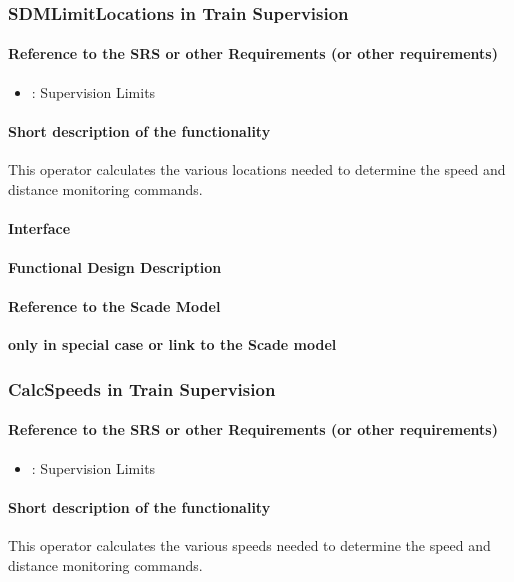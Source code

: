 \subsubsection{SDMLimitLocations in Train Supervision} 
\paragraph{Reference to the SRS or other Requirements (or other requirements)}
\begin{itemize}
	\item \cite[Chapt.~3.13.9]{subset-026}: Supervision Limits 
\end{itemize}

\paragraph{Short description of the functionality}
This operator calculates the various locations needed to determine the speed and distance monitoring commands.

\paragraph{Interface}
\paragraph{Functional Design Description}
\paragraph{Reference to the Scade Model}
\textbf{only in special case or link to the Scade model}

\subsubsection{CalcSpeeds in Train Supervision}
\paragraph{Reference to the SRS or other Requirements (or other requirements)}
\begin{itemize}
	\item \cite[Chapt.~3.13.9]{subset-026}: Supervision Limits 
\end{itemize}
\paragraph{Short description of the functionality}
This operator calculates the various speeds needed to determine the speed and distance monitoring commands.
